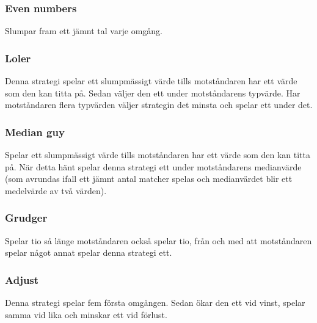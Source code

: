 \subsubsection{Even numbers}
Slumpar fram ett jämnt tal varje omgång.

\subsubsection{Loler}
Denna strategi spelar ett slumpmässigt värde tills motståndaren har ett värde som den kan titta på. Sedan väljer den ett under motståndarens typvärde. Har motståndaren flera typvärden väljer strategin det minsta och spelar ett under det.

\subsubsection{Median guy}
Spelar ett slumpmässigt värde tills motståndaren har ett värde som den kan titta på. När detta hänt spelar denna strategi ett under motståndarens medianvärde (som avrundas ifall ett jämnt antal matcher spelas och medianvärdet blir ett medelvärde av två värden).

\subsubsection{Grudger}
Spelar tio så länge motståndaren också spelar tio, från och med att motståndaren spelar något annat spelar denna strategi ett.

\subsubsection{Adjust}
Denna strategi spelar fem första omgången. Sedan ökar den ett vid vinst, spelar samma vid lika och minskar ett vid förlust.